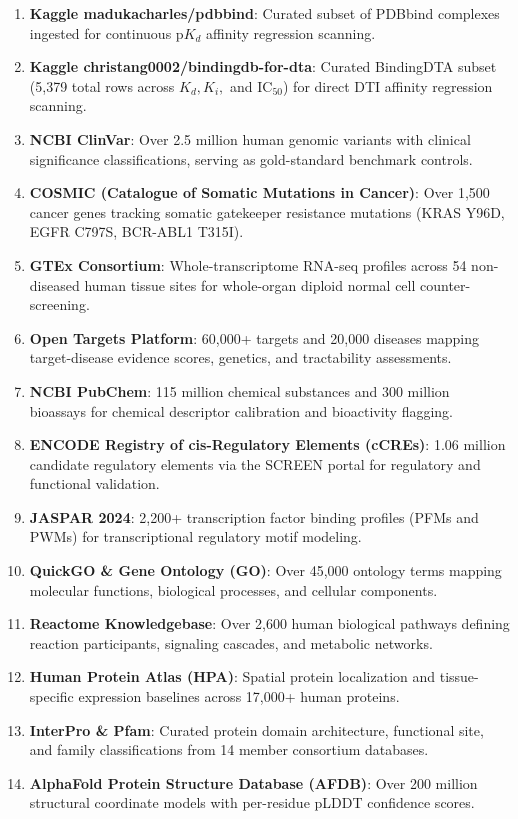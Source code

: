 \documentclass[11pt,a4paper]{article}
\begin{document}
\begin{enumerate}
    \item \textbf{Kaggle madukacharles/pdbbind}: Curated subset of PDBbind complexes ingested for continuous $\text{p}K_d$ affinity regression scanning.
    \item \textbf{Kaggle christang0002/bindingdb-for-dta}: Curated BindingDTA subset (5,379 total rows across $K_d, K_i,$ and $\text{IC}_{50}$) for direct DTI affinity regression scanning.
    \item \textbf{NCBI ClinVar}: Over 2.5 million human genomic variants with clinical significance classifications, serving as gold-standard benchmark controls.
    \item \textbf{COSMIC (Catalogue of Somatic Mutations in Cancer)}: Over 1,500 cancer genes tracking somatic gatekeeper resistance mutations (KRAS Y96D, EGFR C797S, BCR-ABL1 T315I).
    \item \textbf{GTEx Consortium}: Whole-transcriptome RNA-seq profiles across 54 non-diseased human tissue sites for whole-organ diploid normal cell counter-screening.
    \item \textbf{Open Targets Platform}: 60,000+ targets and 20,000 diseases mapping target-disease evidence scores, genetics, and tractability assessments.
    \item \textbf{NCBI PubChem}: 115 million chemical substances and 300 million bioassays for chemical descriptor calibration and bioactivity flagging.
    \item \textbf{ENCODE Registry of cis-Regulatory Elements (cCREs)}: 1.06 million candidate regulatory elements via the SCREEN portal for regulatory and functional validation.
    \item \textbf{JASPAR 2024}: 2,200+ transcription factor binding profiles (PFMs and PWMs) for transcriptional regulatory motif modeling.
    \item \textbf{QuickGO \& Gene Ontology (GO)}: Over 45,000 ontology terms mapping molecular functions, biological processes, and cellular components.
    \item \textbf{Reactome Knowledgebase}: Over 2,600 human biological pathways defining reaction participants, signaling cascades, and metabolic networks.
    \item \textbf{Human Protein Atlas (HPA)}: Spatial protein localization and tissue-specific expression baselines across 17,000+ human proteins.
    \item \textbf{InterPro \& Pfam}: Curated protein domain architecture, functional site, and family classifications from 14 member consortium databases.
    \item \textbf{AlphaFold Protein Structure Database (AFDB)}: Over 200 million structural coordinate models with per-residue pLDDT confidence scores.
\end{enumerate}
\end{document}

